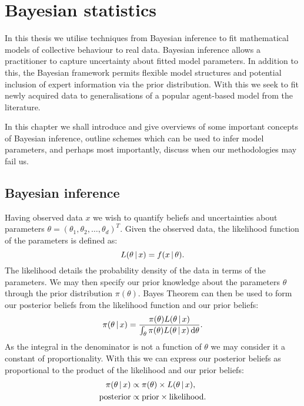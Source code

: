 \graphicspath{{fig/bayes_intro/}}

\chapter{Bayesian statistics}
\label{cha:bayes_intro}

In this thesis we utilise techniques from Bayesian inference to fit mathematical models of
collective behaviour to real data. Bayesian inference allows a practitioner to capture
uncertainty about fitted model parameters. In addition to this, the Bayesian framework
permits flexible model structures and potential inclusion of expert information via the
prior distribution. With this we seek to fit newly acquired data to generalisations of a
popular agent-based model from the literature.

In this chapter we shall introduce and give overviews of some important concepts of
Bayesian inference, outline schemes which can be used to infer model parameters, and
perhaps most importantly, discuss when our methodologies may fail us.

\section{Bayesian inference}
\label{sec:bayesian_inference}

Having observed data $x$ we wish to quantify beliefs and uncertainties about
parameters $\theta = (\theta_1,\theta_2,\dots,\theta_d)^T$. Given the observed data,
the likelihood function of the parameters is defined as:
\begin{equation}
  L(\theta \,|\, x) = f(x \,|\,\theta).
\end{equation}
The likelihood details the probability density of the data in terms of the parameters. We
may then specify our prior knowledge about the parameters $\theta$ through the prior
distribution $\pi(\theta)$. Bayes Theorem can then be used to form our posterior
beliefs from the likelihood function and our prior beliefs:
\begin{equation}
  \label{eq:bayes_theorem}
  \pi(\theta \given x) =
    \frac{\pi(\theta) L(\theta\given x)}%
         {\int_{\theta} \pi(\theta) L(\theta\given x) \, \textup{d}\theta}.
\end{equation}
As the integral in the denominator is not a function of $\theta$ we may consider it a
constant of proportionality. With this we can express our posterior beliefs as
proportional to the product of the likelihood and our prior beliefs:
\begin{align*}
  \pi(\theta\,|\, x) & \propto \pi(\theta) \times L(\theta\,|\, x), \\
  \text{posterior}             & \propto \text{prior} \times \text{likelihood}.
\end{align*}

